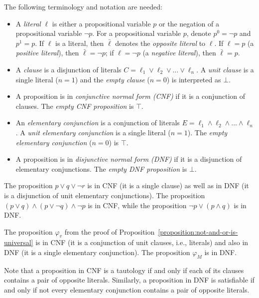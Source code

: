 The following terminology and notation are needed:
\begin{itemize}
    \item A \emph{literal} $\ell$ is either a propositional variable $p$ or the negation of a propositional variable $\neg p$. For a propositional variable $p$, denote $p^0=\neg p$ and $p^1=p$. If $\ell$ is a literal, then $\bar{\ell}$ denotes the \emph{opposite literal} to $\ell$. If $\ell=p$ (a \emph{positive literal}), then $\bar{\ell}=\neg p$; if $\ell=\neg p$ (a \emph{negative literal}), then $\bar{\ell}=p$.
    \item A \emph{clause} is a disjunction of literals $C=\ell_1 \lor \ell_2 \lor \dots \lor \ell_n$. A \emph{unit clause} is a single literal ($n=1$) and the \emph{empty clause} ($n=0$) is interpreted as $\bot$.
    \item A proposition is in \emph{conjunctive normal form (CNF)} if it is a conjunction of clauses. The \emph{empty CNF proposition} is $\top$.
    \item An \emph{elementary conjunction} is a conjunction of literals $E=\ell_1 \land \ell_2 \land \dots \land \ell_n$. A \emph{unit elementary conjunction} is a single literal ($n=1$). The \emph{empty elementary conjunction} ($n=0$) is $\top$.
    \item A proposition is in \emph{disjunctive normal form (DNF)} if it is a disjunction of elementary conjunctions. The \emph{empty DNF proposition} is $\bot$.
\end{itemize}

\begin{example}
    The proposition ${{p\lor q}\lor\neg r}$ is in CNF (it is a single clause) as well as in DNF (it is a disjunction of unit elementary conjunctions). The proposition $(p\lor q)\land (p\lor \neg q)\land \neg p$ is in CNF, while the proposition $\neg p\lor (p\land q)$ is in DNF.
\end{example}

\begin{example}
    The proposition $\varphi_v$ from the proof of Proposition~\ref{proposition:not-and-or-is-universal} is in CNF (it is a conjunction of unit clauses, i.e., literals) and also in DNF (it is a single elementary conjunction). The proposition $\varphi_M$ is in DNF.
\end{example}

\begin{observation}
    Note that a proposition in CNF is a tautology if and only if each of its clauses contains a pair of opposite literals. Similarly, a proposition in DNF is satisfiable if and only if not every elementary conjunction contains a pair of opposite literals.
\end{observation}


